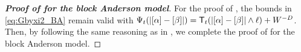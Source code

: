 \begin{proof}[\bf Proof of  for the block Anderson model]





 



For the proof of , the bounds in \eqref{eq:Gbyxi2_BA} remain valid with $\Psi_t(|[\alpha]-[\beta]|)={\mathsf T}_t(|[\alpha]-[\beta]|\wedge\ell)+W^{-D}$. Then, by following the same reasoning as in , we complete the proof of  for the block Anderson model.
\end{proof}


